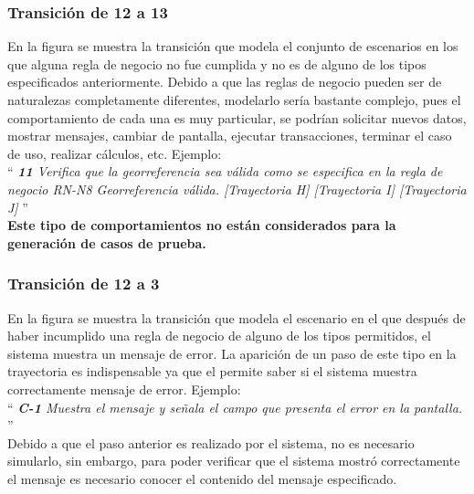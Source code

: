 \subsubsection{Transición de 12 a 13}
 
En la figura  se muestra la transición que modela el conjunto de escenarios en los que alguna regla de negocio no fue cumplida y no es de alguno de los tipos especificados anteriormente. Debido a que las reglas de negocio pueden ser de naturalezas completamente diferentes, modelarlo sería bastante complejo, pues el comportamiento de cada una es muy particular, se podrían solicitar nuevos datos, mostrar mensajes, cambiar de pantalla, ejecutar transacciones, terminar el caso de uso, realizar cálculos, etc. Ejemplo:\\
	 

	``{\it
	    {\bf 11} \UCsist Verifica que la georreferencia sea válida como se especifica en la regla de negocio RN-N8 Georreferencia válida. [Trayectoria H] [Trayectoria I] [Trayectoria J]
	}''\\
	
		{\bf Este tipo de comportamientos no están considerados para la generación de casos de prueba.}
		
\subsubsection{Transición de 12 a 3} 

En la figura  se muestra la transición que modela el escenario en el que después de haber incumplido una regla de negocio de alguno de los tipos permitidos, el sistema muestra un mensaje de error.
La aparición de un paso de este tipo en la trayectoria es indispensable ya que el  permite saber si el sistema muestra correctamente mensaje de error. Ejemplo: \\

		``{\it
		     {\bf C-1} \UCsist Muestra el mensaje  y señala el campo que presenta el error en la pantalla. 
		}''\\
	
			Debido a que el paso anterior es realizado por el sistema, no es necesario simularlo, sin embargo, para poder verificar que el sistema mostró correctamente el mensaje es necesario conocer el contenido del mensaje especificado.
			

